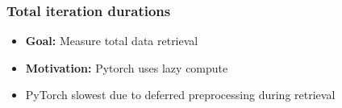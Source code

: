 \documentclass[t,english]{beamer}
\begin{document}
\begin{frame}
    \frametitle{Total iteration durations}
        \begin{itemize}
        \item<1-> \textbf{Goal:} Measure total data retrieval
        \item<2-> \textbf{Motivation:} Pytorch uses lazy compute
        \end{itemize}
    \begin{itemize}
        \item<4->  PyTorch slowest due to deferred preprocessing during retrieval
    \end{itemize}
\end{frame}
\end{document}
